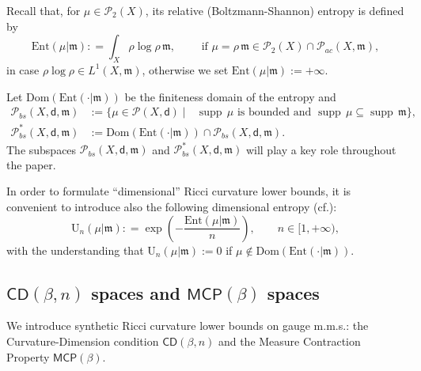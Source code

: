 \documentclass[11pt,a4paper]{article}
\theoremstyle{plain}
\theoremstyle{definition}
\theoremstyle{remark}
\numberwithin{equation}{section}
\DeclareMathOperator{\supp}{\mathrm{supp}}
\newcommand{\CD}{\mathsf{CD}}
\newcommand{\MCP}{\mathsf{MCP}}
\newcommand{\Ent}{\mathrm{Ent}}
\newcommand{\U}{\mathrm{U}}
\newcommand{\Dom}{\mathrm{Dom}}
\newcommand{\Prob}{\mathcal{P}}
\newcommand{\mm}{\mathfrak m}
\newcommand{\sfd}{\mathsf d}
\begin{document}
Recall that, for $\mu \in \mathcal{P}_{2}(X)$, its relative (Boltzmann-Shannon) entropy  is defined by
\begin{equation}\label{def:Ent-Intro}
\Ent(\mu|\mm): = \int_{X} \rho \log \rho \, \mm,\qquad  \text{ if $\mu = \rho \, \mm\in \Prob_{2}(X)\cap \Prob_{ac}(X,\mm)$},
\end{equation}
in case  $\rho\log \rho\in L^{1}(X,\mm)$,  otherwise we set $\Ent(\mu|\mm) := +\infty$.

Let $\Dom(\Ent(\cdot|\mm))$ be the finiteness domain of the entropy and 
\begin{align}
\Prob_{bs}(X,\sfd,\mm)&:=  \{\mu\in \Prob(X,\sfd)\mid \text{ $\supp \, \mu$ is bounded and }  \supp \, \mu\subseteq \supp \, \mm \},\\
\Prob_{bs}^*(X,\sfd,\mm)&:= \Dom(\Ent(\cdot|\mm)) \cap \Prob_{bs}(X,\sfd,\mm).
\end{align}
The subspaces $\Prob_{bs}(X,\sfd,\mm)$ and $\Prob_{bs}^*(X,\sfd,\mm)$ will play a key role throughout the paper.

In order to formulate ``dimensional''  Ricci curvature lower bounds, it is convenient  to introduce also  the following dimensional entropy (cf.\@ \cite{EKS}):
%
\begin{equation}\label{eq:defUn-Intro}
\U_{n}(\mu|\mm) : = \exp\left(-\frac{\Ent(\mu|\mm)}{n} \right), \qquad n\in [1,+\infty),
\end{equation}
with the understanding that $\U_{n}(\mu|\mm):=0$ if $\mu\notin \Dom(\Ent(\cdot|\mm))$.

\subsection*{$\CD(\beta,n)$ spaces and $\MCP(\beta)$ spaces}

We introduce synthetic Ricci curvature lower bounds on gauge m.m.s.: the Curvature-Dimension condition $\CD(\beta,n)$ and the Measure Contraction Property $\MCP(\beta)$.
\end{document}
